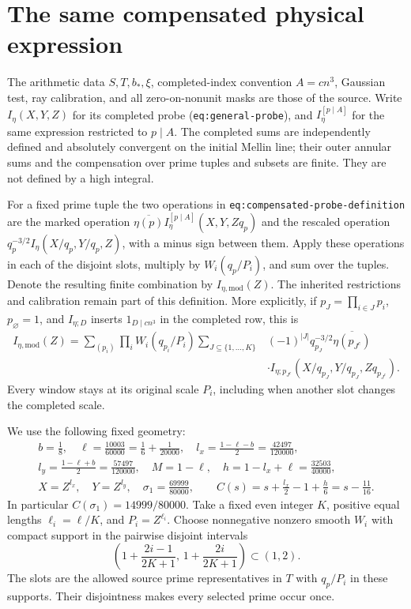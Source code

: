 \documentclass[11pt,a4paper]{article}
\theoremstyle{definition}
\newcommand{\sig}{\sigma_1}
\newcommand{\src}[1]{\nolinkurl{#1}}
\begin{document}
\section{The same compensated physical expression}
\label{sec:physical}
The arithmetic data $S,T,b_*,\xi$, completed-index convention $A=cn^3$,
Gaussian test, ray calibration, and all zero-on-nonunit masks are
those of the source. Write $I_\eta(X,Y,Z)$ for its completed probe
(\src{eq:general-probe}), and $I_\eta^{[p\mid A]}$ for the same
expression restricted to $p\mid A$. The completed sums are independently
defined and absolutely convergent on the initial Mellin line; their
outer annular sums and the compensation over prime tuples and subsets
are finite. They are not defined by a high integral.

For a fixed prime tuple the two operations in
\src{eq:compensated-probe-definition} are the marked operation
$\overline{\eta(p)}I_\eta^{[p\mid A]}(X,Y,Zq_p)$ and the rescaled
operation $q_p^{-3/2}I_\eta(X/q_p,Y/q_p,Z)$, with a minus sign
between them. Apply these operations in each of the disjoint slots,
multiply by $W_i(q_p/P_i)$, and sum over the tuples. Denote the resulting
finite combination by $I_{\eta,\mathrm{mod}}(Z)$. The inherited
restrictions and calibration remain part of this definition.
More explicitly, if $p_J=\prod_{i\in J}p_i$, $p_\varnothing=1$, and
$I_{\eta;D}$ inserts $1_{D\mid cn^3}$ in the completed row, this is
\begin{equation}\label{eq:physicalsum}
\begin{split}
 I_{\eta,\mathrm{mod}}(Z)
 =\sum_{(p_i)}\prod_i W_i(q_{p_i}/P_i)
 \sum_{J\subseteq\{1,\ldots,K\}}&
 (-1)^{|J|}q_{p_J}^{-3/2}\overline{\eta(p_{J^c})}\\
 &\cdot I_{\eta;p_{J^c}}(X/q_{p_J},Y/q_{p_J},Zq_{p_{J^c}}).
\end{split}
\end{equation}
Every window stays at its original scale $P_i$, including when
another slot changes the completed scale.

We use the following fixed geometry:
\begin{equation}\label{eq:geometry}
\begin{gathered}
 b=\frac18,\quad \ell=\frac{10003}{60000}=\frac16+\frac1{20000},
 \quad l_x=\frac{1-\ell-b}{2}=\frac{42497}{120000},\\
 l_y=\frac{1-\ell+b}{2}=\frac{57497}{120000},\quad
 M=1-\ell,\quad h=1-l_x+\ell=\frac{32503}{40000},\\
 X=Z^{l_x},\quad Y=Z^{l_y},\quad
 \sig=\frac{69999}{80000},\qquad
 C(s)=s+\frac{l_x}{2}-1+\frac h6=s-\frac{11}{16}.
\end{gathered}
\end{equation}
In particular $C(\sig)=14999/80000$.
Take a fixed even integer $K$, positive equal lengths $\ell_i=\ell/K$,
and $P_i=Z^{\ell_i}$. Choose nonnegative nonzero smooth $W_i$ with
compact support in the pairwise disjoint intervals
\[
 \left(1+\frac{2i-1}{2K+1},\,1+\frac{2i}{2K+1}\right)\subset(1,2).
\]
The slots are the allowed source prime representatives in $T$ with
$q_p/P_i$ in these supports. Their disjointness makes every selected
prime occur once.
\end{document}

